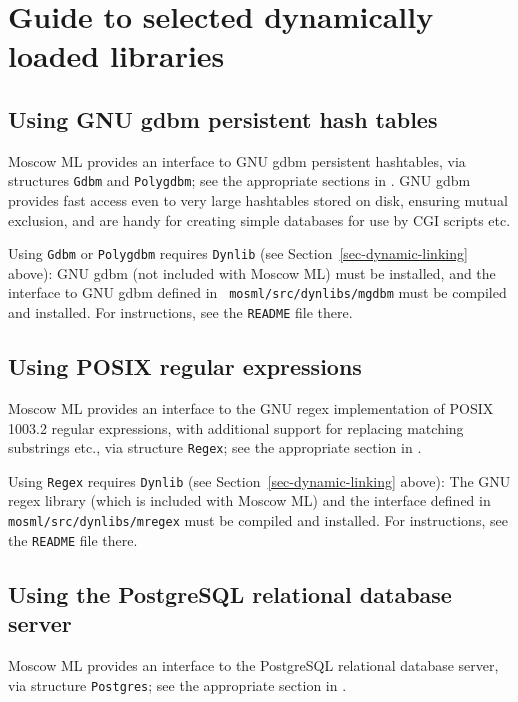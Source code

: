 \documentclass[fleqn,a4paper]{article}
\begin{document}
\newpage \section{Guide to selected dynamically loaded libraries}

\subsection{Using GNU gdbm persistent hash tables }
\label{sec-using-mgdbm}

Moscow ML provides an interface to GNU gdbm persistent hashtables, via
structures {\tt Gdbm} and {\tt Polygdbm}; see the appropriate sections
in \cite{MoscowML:2000:MoscowMLLibrary}.  GNU gdbm provides fast
access even to very large hashtables stored on disk, ensuring mutual
exclusion, and are handy for creating simple databases for use by CGI
scripts etc.

Using \texttt{Gdbm} or \texttt{Polygdbm} requires {\tt Dynlib} (see
Section~\ref{sec-dynamic-linking} above): GNU gdbm (not included with Moscow
ML) must be installed, and the interface to GNU gdbm defined in {\tt
  mosml/src/dynlibs/mgdbm} must be compiled and installed.  For
instructions, see the {\tt README} file there.


\subsection{Using POSIX regular expressions}
\label{sec-using-mregex}

Moscow ML provides an interface to the GNU regex implementation of
POSIX 1003.2 regular expressions, with additional support for
replacing matching substrings etc., via structure {\tt Regex}; see the
appropriate section in \cite{MoscowML:2000:MoscowMLLibrary}.

Using \texttt{Regex} requires {\tt Dynlib} (see
Section~\ref{sec-dynamic-linking} above): The GNU regex library (which is
included with Moscow ML) and the interface defined in {\tt
  mosml/src/dynlibs/mregex} must be compiled and installed.  For
instructions, see the {\tt README} file there.


\subsection{Using the PostgreSQL relational database server}
\label{sec-using-mpq}

Moscow ML provides an interface to the PostgreSQL relational database
server, via structure {\tt Postgres}; see the appropriate section in
\cite{MoscowML:2000:MoscowMLLibrary}.
\end{document}
